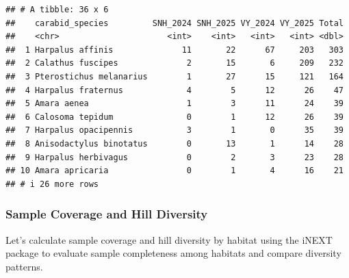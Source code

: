 \documentclass[
]{article}
\begin{document}
\begin{verbatim}
## # A tibble: 36 x 6
##    carabid_species         SNH_2024 SNH_2025 VY_2024 VY_2025 Total
##    <chr>                      <int>    <int>   <int>   <int> <dbl>
##  1 Harpalus affinis              11       22      67     203   303
##  2 Calathus fuscipes              2       15       6     209   232
##  3 Pterostichus melanarius        1       27      15     121   164
##  4 Harpalus fraternus             4        5      12      26    47
##  5 Amara aenea                    1        3      11      24    39
##  6 Calosoma tepidum               0        1      12      26    39
##  7 Harpalus opacipennis           3        1       0      35    39
##  8 Anisodactylus binotatus        0       13       1      14    28
##  9 Harpalus herbivagus            0        2       3      23    28
## 10 Amara apricaria                0        1       4      16    21
## # i 26 more rows
\end{verbatim}

\subsubsection{Sample Coverage and Hill
Diversity}\label{sample-coverage-and-hill-diversity-1}

Let's calculate sample coverage and hill diversity by habitat using the
iNEXT package to evaluate sample completeness among habitats and compare
diversity patterns.
\end{document}
